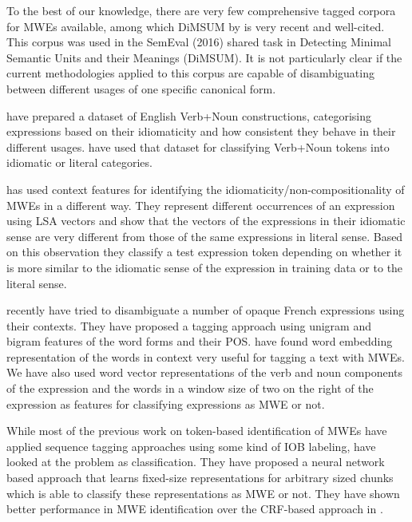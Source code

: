 \documentclass[output=paper
,modfonts
,nonflat]{langsci/langscibook}
\begin{document}
To the best of our knowledge, there are very few comprehensive tagged corpora for MWEs available, among which DiMSUM by \cite{schneider-dimsum:2016} is very recent and well-cited. This corpus was used in the SemEval (2016) shared task in Detecting Minimal Semantic Units and their Meanings (DiMSUM).
It is not particularly clear if the current methodologies applied to this corpus are capable of disambiguating between different usages of one specific canonical form.


\cite{cook2008vnc} have prepared a dataset of English Verb+Noun constructions, categorising expressions based on their idiomaticity and how consistent they behave in their different usages. \cite{fazly-cook-stevenson:2009:CL} have used that dataset for classifying Verb+Noun tokens into idiomatic or literal categories.

\cite{Katz06automaticidentification} has used context features for identifying the idiomaticity\//non-compositionality of MWEs in a different way. They represent different occurrences of an expression using LSA vectors and show that the vectors of the expressions in their idiomatic sense are very different from those of the same expressions in literal sense. Based on this observation they classify a test expression token depending on whether it is more similar to the idiomatic sense of the expression in training data or to the literal sense. %

\cite{scholivet-ramisch:2017:MWE2017} recently have tried to disambiguate a number of opaque French expressions using their contexts. They have proposed a tagging approach using unigram and bigram features of the word forms and their POS.
\cite{Qu+:2015a} have found word embedding representation of the words in context very useful for tagging a text with MWEs. We have also used word vector representations of the verb and noun components of the expression and the words in a window size of two on the right of the expression as features for classifying expressions as MWE or not. 

While most of the previous work on token-based identification of MWEs have applied sequence tagging approaches using some kind of IOB labeling, \cite{legrand2016phrase} have looked at the problem as classification. They have proposed a neural network based approach that learns fixed-size representations for arbitrary sized chunks which is able to classify these representations as MWE or not. They have shown better performance in MWE identification over the CRF-based approach in \cite{constant2013}.
\end{document}
